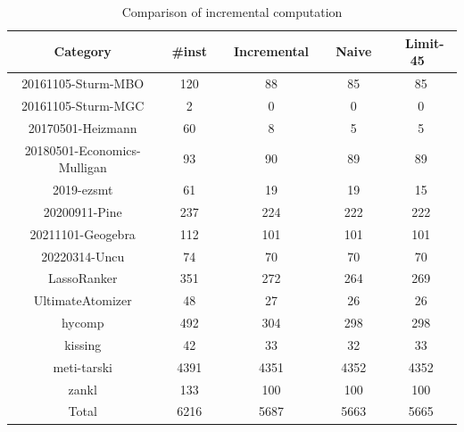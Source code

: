 \begin{frame}
    \begin{table}[!t]
        \small
        \centering
        \begin{tabular}{c | c | c | c | c }
        Category & ~\#inst~ & ~Incremental~ & ~Naive~ & ~Limit-45~ \\ \hline
        20161105-Sturm-MBO & 120 & 88 & 85 & 85 \\
        20161105-Sturm-MGC & 2 & 0 & 0 & 0 \\
        20170501-Heizmann & 60 & 8 & 5 & 5 \\
        20180501-Economics-Mulligan & 93 & 90 & 89 & 89 \\
        2019-ezsmt & 61 & 19 & 19 & 15 \\
        20200911-Pine & 237 & 224 & 222 & 222 \\
        20211101-Geogebra & 112 & 101 & 101 & 101 \\
        20220314-Uncu & 74 & 70 & 70 & 70 \\
        LassoRanker & 351 & 272 & 264 & 269 \\
        UltimateAtomizer & 48 & 27 & 26 & 26 \\
        hycomp & 492 & 304 & 298 & 298 \\
        kissing & 42 & 33 & 32 & 33 \\
        meti-tarski & 4391 & 4351 & 4352 & 4352 \\
        zankl & 133 & 100 & 100 & 100 \\ \hline
        Total & 6216 & 5687 & 5663 & 5665
        \end{tabular}
        \vspace{2mm}
        \caption{Comparison of incremental computation}
        \label{tab:compare-incremental}
        \end{table}
\end{frame}

